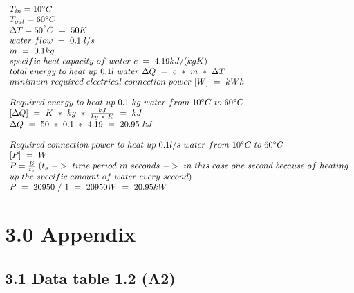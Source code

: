 \documentclass[10pt,ngerman]{scrartcl}
\begin{document}
$
\begin{array}{l}
T_{in} = 10\degree C\\
T_{out} = 60\degree C\\
\Delta T=50^{\degree } C\ =\ 50K\\
water\ flow\ =\ 0.1\ l/s\\
m\ =\ 0.1 kg\\
specific\ heat\ capacity\ of\ water\ c\ =\ 4.19kJ/( kgK)\\
total\ energy\ to\ heat\ up\ 0.1 l\ water\ \Delta Q\ =\ c\ *\ m\ *\ \Delta T\\
minimum\ required\ electrical\ connection\ power\ [ W] \ =\ kWh\\
\\
Required\ energy\ to\ heat\ up\ 0.1\ kg\ water\ from\ 10\degree C\ to\ 60\degree C\\
\left[\Delta Q\right] \ =\ K\ *\ kg\ *\ \frac{kJ}{kg\ *\ K} \ =\ kJ\\
\Delta Q\ =\ 50\ *\ 0.1\ *\ 4.19\ =\ 20.95\ kJ\\
\\
Required\ connection\ power\ to\ heat\ up\ 0.1l/s\ water\ from\ 10\degree C\ to\ 60\degree C\\
\left[ P\right] \ =\ W\\
P = \frac{E}{t_{s}} \ ( t_{s} \ -> \ time \ period \ in \ seconds \ -> \ in \ this \ case \ one \ second \ because \ of \ heating \\ 
up \ the \ specific \ amount \ of \ water \ every \ second)\\
P\ =\ 20950\ /\ 1\ =\ 20950W\ =\ 20.95kW

\end{array}
$

\newpage
\section{3.0 Appendix}
\subsection{3.1 Data table 1.2 (A2)}
\label{sec:data-table-a2}

\end{document}
